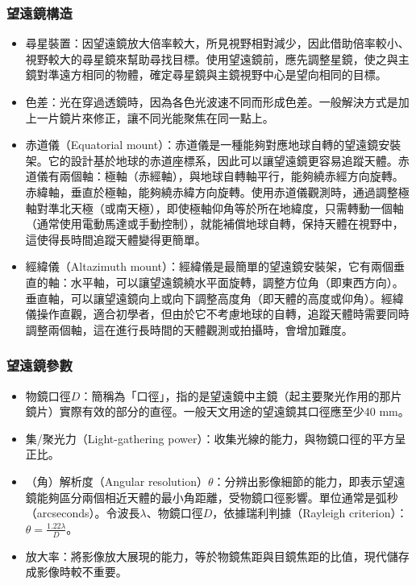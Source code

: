 \documentclass[a4paper,12pt]{report}
\begin{document}
\subsubsection{望遠鏡構造}
\begin{itemize}
\item 尋星裝置：因望遠鏡放大倍率較大，所見視野相對減少，因此借助倍率較小、視野較大的尋星鏡來幫助尋找目標。使用望遠鏡前，應先調整星鏡，使之與主鏡對準遠方相同的物體，確定尋星鏡與主鏡視野中心是望向相同的目標。
\item 色差：光在穿過透鏡時，因為各色光波速不同而形成色差。一般解決方式是加上一片鏡片來修正，讓不同光能聚焦在同一點上。
\item 赤道儀（Equatorial mount）：赤道儀是一種能夠對應地球自轉的望遠鏡安裝架。它的設計基於地球的赤道座標系，因此可以讓望遠鏡更容易追蹤天體。赤道儀有兩個軸：極軸（赤經軸），與地球自轉軸平行，能夠繞赤經方向旋轉。赤緯軸，垂直於極軸，能夠繞赤緯方向旋轉。使用赤道儀觀測時，通過調整極軸對準北天極（或南天極），即使極軸仰角等於所在地緯度，只需轉動一個軸（通常使用電動馬達或手動控制），就能補償地球自轉，保持天體在視野中，這使得長時間追蹤天體變得更簡單。
\item 經緯儀（Altazimuth mount）：經緯儀是最簡單的望遠鏡安裝架，它有兩個垂直的軸：水平軸，可以讓望遠鏡繞水平面旋轉，調整方位角（即東西方向）。垂直軸，可以讓望遠鏡向上或向下調整高度角（即天體的高度或仰角）。經緯儀操作直觀，適合初學者，但由於它不考慮地球的自轉，追蹤天體時需要同時調整兩個軸，這在進行長時間的天體觀測或拍攝時，會增加難度。
\end{itemize}
\subsubsection{望遠鏡參數}
\begin{itemize}
\item 物鏡口徑$D$：簡稱為「口徑」，指的是望遠鏡中主鏡（起主要聚光作用的那片鏡片）實際有效的部分的直徑。一般天文用途的望遠鏡其口徑應至少40 mm。
\item 集/聚光力（Light-gathering power）：收集光線的能力，與物鏡口徑的平方呈正比。
\item （角）解析度（Angular resolution）$\theta$：分辨出影像細節的能力，即表示望遠鏡能夠區分兩個相近天體的最小角距離，受物鏡口徑影響。單位通常是弧秒（arcseconds）。令波長$\lambda$、物鏡口徑$D$，依據瑞利判據（Rayleigh criterion）：$\theta = \frac{1.22 \lambda}{D}$。
\item 放大率：將影像放大展現的能力，等於物鏡焦距與目鏡焦距的比值，現代儲存成影像時較不重要。
\end{itemize}
\end{document}
